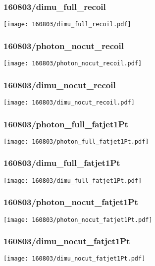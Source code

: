 \begin{frame}
   \frametitle{\small 160803/dimu\_full\_recoil}
   \centering
   \texttt{[image: 160803/dimu\_full\_recoil.pdf]}
\end{frame}

\begin{frame}
   \frametitle{\small 160803/photon\_nocut\_recoil}
   \centering
   \texttt{[image: 160803/photon\_nocut\_recoil.pdf]}
\end{frame}

\begin{frame}
   \frametitle{\small 160803/dimu\_nocut\_recoil}
   \centering
   \texttt{[image: 160803/dimu\_nocut\_recoil.pdf]}
\end{frame}

\begin{frame}
   \frametitle{\small 160803/photon\_full\_fatjet1Pt}
   \centering
   \texttt{[image: 160803/photon\_full\_fatjet1Pt.pdf]}
\end{frame}

\begin{frame}
   \frametitle{\small 160803/dimu\_full\_fatjet1Pt}
   \centering
   \texttt{[image: 160803/dimu\_full\_fatjet1Pt.pdf]}
\end{frame}

\begin{frame}
   \frametitle{\small 160803/photon\_nocut\_fatjet1Pt}
   \centering
   \texttt{[image: 160803/photon\_nocut\_fatjet1Pt.pdf]}
\end{frame}

\begin{frame}
   \frametitle{\small 160803/dimu\_nocut\_fatjet1Pt}
   \centering
   \texttt{[image: 160803/dimu\_nocut\_fatjet1Pt.pdf]}
\end{frame}

